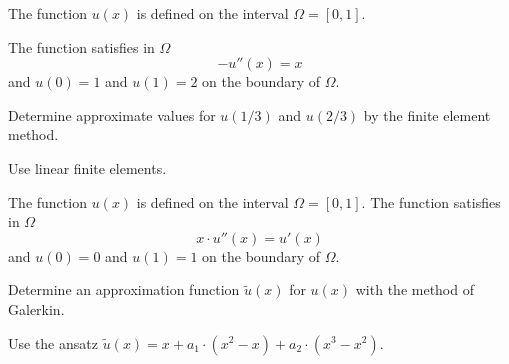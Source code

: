 \begin{teilaufgaben}
\item
The function $u(x)$ is defined on the interval $\Omega = [0, 1].$

The function satisfies in $\Omega$ 
\[
-u''(x) = x
\]
and $u(0) = 1$ and $u(1) = 2$ on the boundary of $\Omega$.

Determine approximate values for $u(1/3)$ and $u(2/3)$ by the
finite element method. 

Use linear finite elements.
\item
The function $u(x)$ is defined on the interval $\Omega = [0, 1].$
The function satisfies in $\Omega$ 
\[
x \cdot u''(x) = u'(x)
\]
and $u(0) = 0$ and $u(1) = 1$ on the boundary of $\Omega$.  

Determine an approximation function $\tilde u(x)$ for $u(x)$ with
the method of Galerkin.

Use the ansatz $\tilde u(x) = x + a_1 \cdot (x^2-x) + a_2 \cdot (x^3-x^2).$
\end{teilaufgaben}

